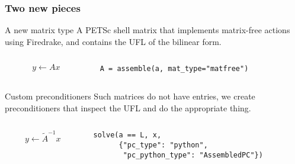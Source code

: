\documentclass[presentation,aspectratio=43]{beamer}
\begin{document}
\begin{frame}[fragile,t]
  \frametitle{Two new pieces}
  \begin{block}{A new matrix type}
    A PETSc shell matrix that implements matrix-free actions using
    Firedrake, and contains the UFL of the bilinear form.
    \begin{columns}
      \begin{column}{0.5\textwidth}
      \begin{equation*}
        y \leftarrow A x
      \end{equation*}
    \end{column}
    \hspace{-0.1\textwidth}
    \begin{column}{0.7\textwidth}
\begin{verbatim}
A = assemble(a, mat_type="matfree")
\end{verbatim}
    \end{column}
    \end{columns}
  \end{block}
  \vspace{1.5\baselineskip}
  \begin{block}{Custom preconditioners}
    Such matrices do not have entries, we create preconditioners
    that inspect the UFL and do the appropriate thing.
    \begin{columns}
      \begin{column}{0.5\textwidth}
    \begin{equation*}
      y \leftarrow \tilde{A}^{-1} x
    \end{equation*}
  \end{column}
  \hspace{-0.1\textwidth}
  \begin{column}{0.7\textwidth}
\begin{verbatim}
solve(a == L, x,
      {"pc_type": "python",
       "pc_python_type": "AssembledPC"})
\end{verbatim}
  \end{column}
  \end{columns}
  \end{block}
\end{frame}
\end{document}
